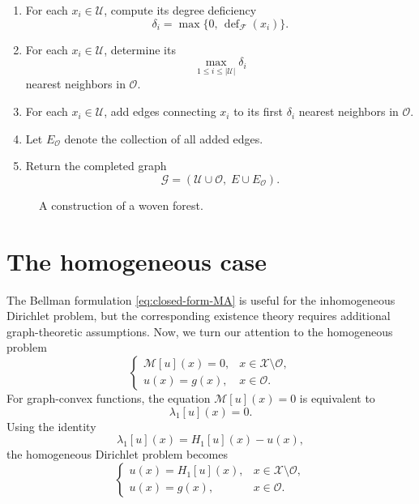 \documentclass[reqno,11pt]{amsart}
\numberwithin{equation}{section}
\theoremstyle{definition}
\theoremstyle{remark}
\begin{document}
\begin{enumerate}
    \item For each \(x_i\in \mathcal{U}\), compute its degree deficiency
    \[
    \delta_i=\max\{0,\,\operatorname{def}_{\mathcal F}(x_i)\}.
    \]

    \item For each \(x_i\in \mathcal{U}\), determine its
    \[
    \max_{1\le i\le |\mathcal{U}|}\delta_i
    \]
    nearest neighbors in \(\mathcal{O}\).

    \item For each \(x_i\in \mathcal{U}\), add edges connecting \(x_i\) to its first
    \(\delta_i\) nearest neighbors in \(\mathcal{O}\).

    \item Let \(E_\mathcal{O}\) denote the collection of all added edges.

    \item Return the completed graph
    \[
    \mathcal{G}=(\mathcal{U}\cup\mathcal{O},\;E\cup E_\mathcal{O}).
    \]
\end{enumerate}

\begin{figure}[ht]
    \centering
    \quad
    
    \medskip
    
    
    \caption{A construction of a woven forest.}
    \label{fig:weave-ex}
\end{figure}

\section{The homogeneous case}

The Bellman formulation \eqref{eq:closed-form-MA} is useful for the inhomogeneous Dirichlet problem, but the corresponding existence theory requires additional graph-theoretic assumptions. 
Now, we turn our attention to the homogeneous problem
\[
\begin{cases}
    \mathcal M [u](x)=0, & x\in \mathcal X\setminus \mathcal O,\\
    u(x)=g(x), & x\in \mathcal O.
\end{cases}
\]
For graph-convex functions, the equation
$\mathcal M [u](x)=0$ is equivalent to 
\[
    \lambda_1[u](x)=0.
\]
Using the identity
\[
    \lambda_1[u](x)=H_1[u](x)-u(x),
\]
the homogeneous Dirichlet problem becomes
\begin{equation}\label{eq:H-M-A}
    \begin{cases}
        u(x)=H_1[u](x),
        & x\in\mathcal X\setminus\mathcal O,\\
        u(x)=g(x),
        & x\in\mathcal O.
    \end{cases}
\end{equation}
\end{document}
